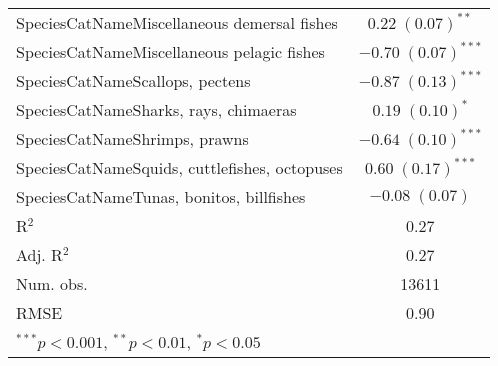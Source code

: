 \documentclass[]{article}
\begin{document}
\begin{table}[h]
\begin{center}
\begin{tabular}{l c }
SpeciesCatNameMiscellaneous demersal fishes   & $0.22 \; (0.07)^{**}$   \\
SpeciesCatNameMiscellaneous pelagic fishes    & $-0.70 \; (0.07)^{***}$ \\
SpeciesCatNameScallops, pectens               & $-0.87 \; (0.13)^{***}$ \\
SpeciesCatNameSharks, rays, chimaeras         & $0.19 \; (0.10)^{*}$    \\
SpeciesCatNameShrimps, prawns                 & $-0.64 \; (0.10)^{***}$ \\
SpeciesCatNameSquids, cuttlefishes, octopuses & $0.60 \; (0.17)^{***}$  \\
SpeciesCatNameTunas, bonitos, billfishes      & $-0.08 \; (0.07)$       \\
\hline
R$^2$                                         & 0.27                    \\
Adj. R$^2$                                    & 0.27                    \\
Num. obs.                                     & 13611                   \\
RMSE                                          & 0.90                    \\
\hline
\multicolumn{2}{l}{\scriptsize{$^{***}p<0.001$, $^{**}p<0.01$, $^*p<0.05$}}
\end{tabular}
\label{table:coefficients}
\end{center}
\end{table}
\end{document}
